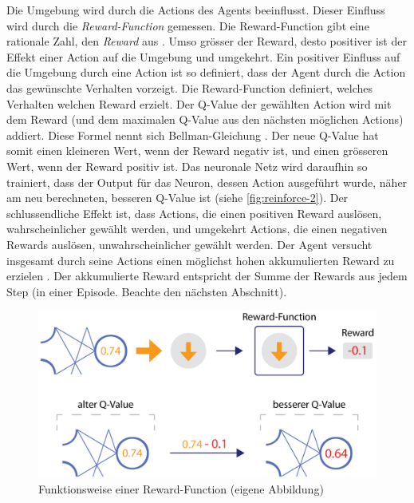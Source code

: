 Die Umgebung wird durch die Actions des Agents beeinflusst. Dieser Einfluss wird
durch die \emph{Reward-Function} gemessen. Die Reward-Function gibt eine
rationale Zahl, den \emph{Reward} aus \cite[S. 75]{sutton_reinforcement_2014}.
Umso grösser der Reward, desto positiver ist der Effekt einer Action auf die
Umgebung und umgekehrt. Ein positiver Einfluss auf die Umgebung durch eine
Action ist so definiert, dass der Agent durch die Action das gewünschte
Verhalten vorzeigt. Die Reward-Function definiert, welches Verhalten welchen
Reward erzielt. Der Q-Value der gewählten Action wird mit dem Reward (und dem
maximalen Q-Value aus den nächsten möglichen Actions) addiert. Diese Formel
nennt sich Bellman-Gleichung \cite[S. 3]{mnih_playing_2013}. Der neue Q-Value
hat somit einen kleineren Wert, wenn der Reward negativ ist, und einen grösseren
Wert, wenn der Reward positiv ist. Das neuronale Netz wird daraufhin so
trainiert, dass der Output für das Neuron, dessen Action ausgeführt wurde, näher
am neu berechneten, besseren Q-Value ist (siehe \autoref{fig:reinforce-2}). Der
schlussendliche Effekt ist, dass Actions, die einen positiven Reward auslösen,
wahrscheinlicher gewählt werden, und umgekehrt Actions, die einen negativen
Rewards auslösen, unwahrscheinlicher gewählt werden. Der Agent versucht
insgesamt durch seine Actions einen möglichst hohen akkumulierten Reward zu
erzielen \cite[S. 57]{sutton_reinforcement_2014}. Der akkumulierte Reward
entspricht der Summe der Rewards aus jedem Step (in einer Episode. Beachte den
nächsten Abschnitt).
 
\begin{figure}[!ht]
   \centering
   \includegraphics[width=\textwidth-2.2cm]{images/theorie/reinforce-2.png}
   \caption{Funktionsweise einer Reward-Function (eigene Abbildung)}\label{fig:reinforce-2}
\end{figure}
 
